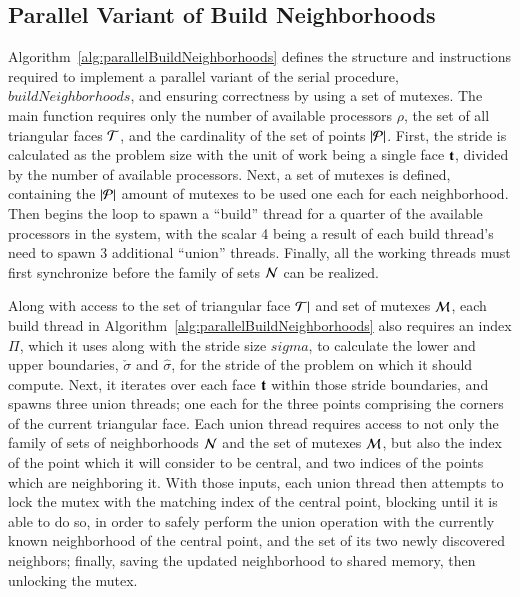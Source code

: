 %
%
\subsection{Parallel Variant of Build Neighborhoods}
\label{ch6sBNPssPVBN}
Algorithm~\ref{alg:parallelBuildNeighborhoods} defines the structure and instructions required to implement a parallel variant of the serial procedure, $\mathit{buildNeighborhoods}$, and ensuring correctness by using a set of mutexes. The main function requires only the number of available processors $\rho$, the set of all triangular faces $\mathcal{T}$, and the cardinality of the set of points $|\mathcal{P}|$. First, the stride is calculated as the problem size with the unit of work being a single face $\mathbf{t}$, divided by the number of available processors. Next, a set of mutexes is defined, containing the $|\mathcal{P}|$ amount of mutexes to be used one each for each neighborhood.  Then begins the loop to spawn a ``build'' thread for a quarter of the available processors in the system, with the scalar 4 being a result of each build thread's need to spawn 3 additional ``union'' threads. Finally, all the working threads must first synchronize before the family of sets $\mathcal{N}$ can be realized.

Along with access to the set of triangular face $\mathcal{T}|$ and set of mutexes $\mathcal{M}$, each build thread in Algorithm~\ref{alg:parallelBuildNeighborhoods} also requires an index $\Pi$, which it uses along with the stride size $sigma$, to calculate the lower and upper boundaries, $\check{\sigma}$ and $\hat{\sigma}$, for the stride of the problem on which it should compute. Next, it iterates over each face $\mathbf{t}$ within those stride boundaries, and spawns three union threads; one each for the three points comprising the corners of the current triangular face. Each union thread requires access to not only the family of sets of neighborhoods $\mathcal{N}$ and the set of mutexes $\mathcal{M}$, but also the index of the point which it will consider to be central, and two indices of the points which are neighboring it. With those inputs, each union thread then attempts to lock the mutex with the matching index of the central point, blocking until it is able to do so, in order to safely perform the union operation with the currently known neighborhood of the central point, and the set of its two newly discovered neighbors; finally, saving the updated neighborhood to shared memory, then unlocking the mutex.

